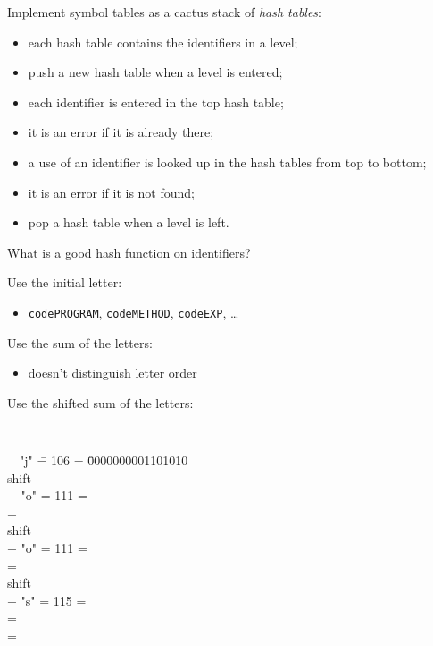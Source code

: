 \begin{slide*}
Implement symbol tables as a cactus stack of {\em hash tables}:

\begin{itemize}
\item each hash table contains the identifiers in a level;

\item push a new hash table when a level is entered;

\item each identifier is entered in the top hash table;

\item it is an error if it is already there;

\item a use of an identifier is looked up in the hash tables from top to bottom;

\item it is an error if it is not found;

\item pop a hash table when a level is left.
\end{itemize}
\vfil
\end{slide*}

\begin{slide*}
What is a good hash function on identifiers?
 
Use the initial letter:
\begin{itemize}
\item {\tt codePROGRAM}, {\tt codeMETHOD}, {\tt codeEXP}, \ldots
\end{itemize}

Use the sum of the letters:
\begin{itemize}
\item doesn't distinguish letter order
\end{itemize}

Use the shifted sum of the letters:
{\tt
\begin{tabbing}
~~"j" \= = 106 = \=0000000001101010\\
shift      \>\\
+ "o" \> = 111 = \\
=           \>\\
shift \>\\
+ "o" \> = 111 = \\
=           \>\\
shift\>\\
+ "s" \> = 115 = \\
= \>\\
= \>
\end{tabbing}
}

\vfil
\end{slide*}

